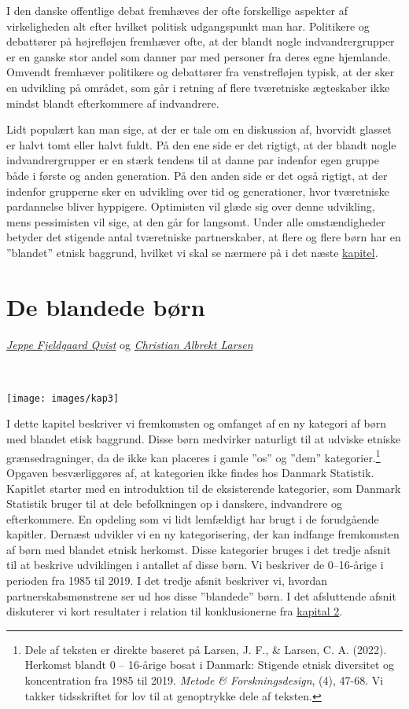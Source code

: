 \documentclass[
]{book}
\begin{document}
I den danske offentlige debat fremhæves der ofte forskellige aspekter af virkeligheden alt efter hvilket politisk udgangspunkt man har. Politikere og debattører på højrefløjen fremhæver ofte, at der blandt nogle indvandrergrupper er en ganske stor andel som danner par med personer fra deres egne hjemlande. Omvendt fremhæver politikere og debattører fra venstrefløjen typisk, at der sker en udvikling på området, som går i retning af flere tværetniske ægteskaber ikke mindst blandt efterkommere af indvandrere.

Lidt populært kan man sige, at der er tale om en diskussion af, hvorvidt glasset er halvt tomt eller halvt fuldt. På den ene side er det rigtigt, at der blandt nogle indvandrergrupper er en stærk tendens til at danne par indenfor egen gruppe både i første og anden generation. På den anden side er det også rigtigt, at der indenfor grupperne sker en udvikling over tid og generationer, hvor tværetniske pardannelse bliver hyppigere. Optimisten vil glæde sig over denne udvikling, mens pessimisten vil sige, at den går for langsomt. Under alle omstændigheder betyder det stigende antal tværetniske partnerskaber, at flere og flere børn har en ''blandet'' etnisk baggrund, hvilket vi skal se nærmere på i det næste \hyperref[kap3]{kapitel}.

\chapter{De blandede børn}\label{kap3}

\emph{\href{https://vbn.aau.dk/da/persons/jeppefl}{Jeppe Fjeldgaard Qvist}} og \emph{\href{https://vbn.aau.dk/en/persons/albrekt}{Christian Albrekt Larsen}}

~~~~

\texttt{[image: images/kap3]}

\newpage

I dette kapitel beskriver vi fremkomsten og omfanget af en ny kategori af børn med blandet etisk baggrund. Disse børn medvirker naturligt til at udviske etniske grænsedragninger, da de ikke kan placeres i gamle ''os'' og ''dem'' kategorier.\footnote{Dele af teksten er direkte baseret på Larsen, J. F., \& Larsen, C. A. (2022). Herkomst blandt 0 -- 16-årige bosat i Danmark: Stigende etnisk diversitet og koncentration fra 1985 til 2019. \emph{Metode \& Forskningsdesign}, (4), 47-68. Vi takker tidsskriftet for lov til at genoptrykke dele af teksten.} Opgaven besværliggøres af, at kategorien ikke findes hos Danmark Statistik. Kapitlet starter med en introduktion til de eksisterende kategorier, som Danmark Statistik bruger til at dele befolkningen op i danskere, indvandrere og efterkommere. En opdeling som vi lidt lemfældigt har brugt i de forudgående kapitler. Dernæst udvikler vi en ny kategorisering, der kan indfange fremkomsten af børn med blandet etnisk herkomst. Disse kategorier bruges i det tredje afsnit til at beskrive udviklingen i antallet af disse børn. Vi beskriver de 0--16-årige i perioden fra 1985 til 2019. I det tredje afsnit beskriver vi, hvordan partnerskabsmønstrene ser ud hos disse ''blandede'' børn. I det afsluttende afsnit diskuterer vi kort resultater i relation til konklusionerne fra \hyperref[kap2]{kapital 2}.
\end{document}
